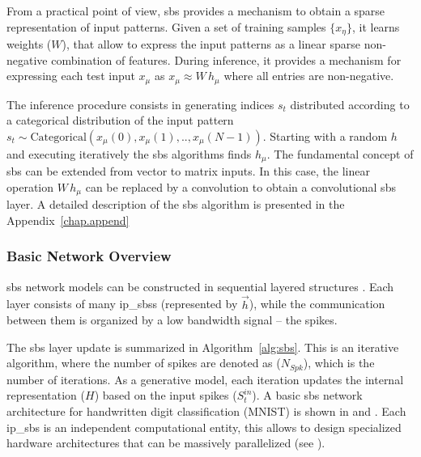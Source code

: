 From a practical point of view, \gls{sbs} provides a mechanism to obtain a sparse representation of input patterns. Given a set of
training samples $\{x_\eta\}$, it learns weights ($W$), that allow
to express the input patterns as a linear sparse non-negative combination
of features.  During inference, it provides a mechanism for expressing
each test input $x_\mu$ as $x_\mu \approx W\, h_\mu$ where all
entries are non-negative.

The inference procedure consists in generating indices $s_t$
distributed according to a categorical distribution of the input pattern
$s_t \sim \mathrm{Categorical}(x_{\mu}(0), x_{\mu}(1), ..,
x_{\mu}(N-1))$. Starting with a random $h$ and executing
iteratively  the \gls{sbs} algorithms finds
$h_{\mu}$. The fundamental concept of \gls{sbs} can be extended from vector to matrix
inputs. In this case, the linear operation $W\, h_\mu$ can be replaced by a
convolution to obtain a convolutional \gls{sbs} layer. A detailed description of the \gls{sbs} algorithm is presented in the Appendix~\ref{chap.append}

\subsubsection{Basic Network Overview}

\gls{sbs} network models can be constructed in sequential layered structures \cite{rotermund2019Backpropagation}. Each layer consists of many \glspl{ip_sbs} (represented by $\vec{h}$), while the communication between them is organized by a low bandwidth signal -- the spikes.

The \gls{sbs} layer update is summarized in Algorithm~\ref{alg:sbs}. This is an iterative algorithm, where the number of spikes are denoted as ($N_{Spk}$), which is the number of iterations. As a generative model, each iteration updates the internal representation ($H$) based on the input spikes ($S^{in}_t$). A basic \gls{sbs} network architecture for handwritten digit classification (MNIST) is shown in  and . Each \gls{ip_sbs} is an independent computational entity, this allows to design specialized hardware architectures that can be massively parallelized (see ).


